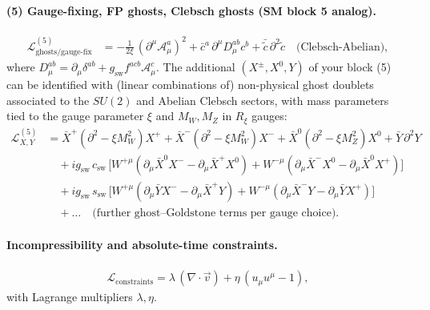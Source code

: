 \documentclass[11pt]{article}
\begin{document}
    \paragraph{(5) Gauge-fixing, FP ghosts, Clebsch ghosts (SM block 5 analog).}
    \begin{align}
        \mathcal{L}^{(5)}_{\text{ghosts/gauge-fix}}
        &= -\frac{1}{2\xi}\,(\partial^\mu \mathcal{A}^a_\mu)^2
        + \bar{c}^a\, \partial^\mu D_\mu^{ab} c^b
        + \bar{\tilde c}\,\partial^2 \tilde c \quad \text{(Clebsch-Abelian)},
    \end{align}
    where \(D_\mu^{ab}=\partial_\mu\delta^{ab}+g_\text{sw} f^{acb}\mathcal{A}_\mu^c\).
    The additional $(X^\pm,X^0,Y)$ of your block (5) can be identified with (linear combinations of) non-physical ghost doublets associated to the $SU(2)$ and Abelian Clebsch sectors, with mass parameters tied to the gauge parameter $\xi$ and $M_W,M_Z$ in $R_\xi$ gauges:
    \begin{align}
        \mathcal{L}^{(5)}_{X,Y}
        &= \bar{X}^+(\partial^2-\xi M_W^2)X^+
        +\bar{X}^-(\partial^2-\xi M_W^2)X^-
        +\bar{X}^0(\partial^2-\xi M_Z^2)X^0
        +\bar{Y}\,\partial^2 Y \nonumber\\
        &\quad + i g_\text{sw}\, c_\text{sw}\,
        \big[ W^{+\mu}(\partial_\mu \bar{X}^0 X^- - \partial_\mu \bar{X}^+ X^0)
        + W^{-\mu}(\partial_\mu \bar{X}^- X^0 - \partial_\mu \bar{X}^0 X^+) \big] \nonumber\\
        &\quad + i g_\text{sw}\, s_\text{sw}\,
        \big[ W^{+\mu}(\partial_\mu \bar{Y} X^- - \partial_\mu \bar{X}^+ Y)
        + W^{-\mu}(\partial_\mu \bar{X}^- Y - \partial_\mu \bar{Y} X^+)\big] \nonumber\\
        &\quad + \dots\quad \text{(further ghost--Goldstone terms per gauge choice)}.
    \end{align}

    \paragraph{Incompressibility and absolute-time constraints.}
    \begin{align}
        \mathcal{L}_{\text{constraints}}
        = \lambda\,(\nabla\!\cdot\!\vec v)
        + \eta\, (u_\mu u^\mu - 1),
    \end{align}
    with Lagrange multipliers \(\lambda,\eta\).

\end{document}
